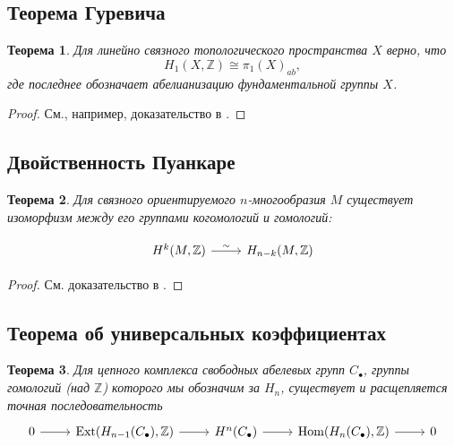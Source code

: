 \documentclass[a4paper, 12pt]{article}
\newtheorem*{theorem}{Теорема}
\begin{document}
    \subsection{Теорема Гуревича}

        \begin{theorem}
            Для линейно связного топологического пространства $X$ верно, что
                 \begin{equation*} H_1(X, \mathbb{Z}) \cong \pi_1(X)_{ab}, \end{equation*}
            где последнее обозначает абелианизацию фундаментальной группы $X$.
        \end{theorem}

        \begin{proof}
            См., например, доказательство в \cite[Chapter~2,~Section~2.A]{Hatcher2001-hm}.
        \end{proof}

    \subsection{Двойственность Пуанкаре}

        \begin{theorem}
            Для связного ориентируемого $n$-многообразия $M$ существует изоморфизм между его группами когомологий и гомологий:
                \[ \begin{tikzcd}
                     H^k(M, \mathbb{Z}) \arrow{r}[label]{\sim} & H_{n - k}(M, \mathbb{Z}) 
                \end{tikzcd} \]
        \end{theorem}

        \begin{proof}
            См. доказательство в \cite[Chapter~3,~Section~3.3]{Hatcher2001-hm}.
        \end{proof}

    \subsection{Теорема об универсальных коэффициентах}

        \begin{theorem}
            Для цепного комплекса свободных абелевых групп $C_\bullet$, группы гомологий (над $\mathbb{Z}$) которого мы обозначим за $H_n$, существует и расщепляется точная последовательность
                \[ \begin{tikzcd}
                    0 \arrow{r} & \textnormal{Ext}(H_{n - 1}(C_\bullet), \mathbb{Z}) \arrow{r} & H^n(C_\bullet) \arrow{r} & \textnormal{Hom}(H_n(C_\bullet), \mathbb{Z}) \arrow{r} & 0 
                \end{tikzcd} \]
            \end{theorem}
\end{document}
